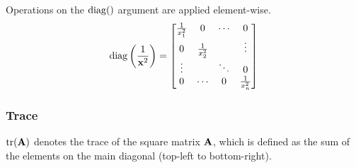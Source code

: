 Operations on the $\operatorname{diag}()$ argument are applied element-wise.
\begin{equation*}
  \operatorname{diag}\left(\frac{1}{\mathbf{x}^2}\right) =
  \begin{bmatrix}
    \frac{1}{x_1^2} & 0 & \cdots & 0 \\
    0 & \frac{1}{x_2^2} & & \vdots \\
    \vdots & & \ddots & 0 \\
    0 & \cdots & 0 & \frac{1}{x_n^2}
  \end{bmatrix}
\end{equation*}

\subsubsection{Trace}
$\operatorname{tr}(\mathbf{A})$ denotes the trace of the square matrix $\mathbf{A}$, which is
defined as the sum of the elements on the main diagonal (top-left to
bottom-right).
